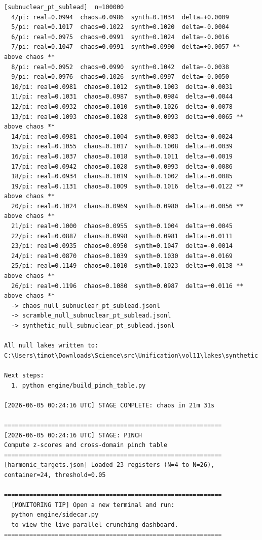 \documentclass[11pt, letterpaper, openany]{book}
\begin{document}
\begin{empiricalbox}
\begin{lstlisting}[style=terminal]
[subnuclear_pt_sublead]  n=100000
  4/pi: real=0.0994  chaos=0.0986  synth=0.1034  delta=+0.0009
  5/pi: real=0.1017  chaos=0.1022  synth=0.1020  delta=-0.0004
  6/pi: real=0.0975  chaos=0.0991  synth=0.1024  delta=-0.0016
  7/pi: real=0.1047  chaos=0.0991  synth=0.0990  delta=+0.0057 ** above chaos **
  8/pi: real=0.0952  chaos=0.0990  synth=0.1042  delta=-0.0038
  9/pi: real=0.0976  chaos=0.1026  synth=0.0997  delta=-0.0050
  10/pi: real=0.0981  chaos=0.1012  synth=0.1003  delta=-0.0031
  11/pi: real=0.1031  chaos=0.0987  synth=0.0984  delta=+0.0044
  12/pi: real=0.0932  chaos=0.1010  synth=0.1026  delta=-0.0078
  13/pi: real=0.1093  chaos=0.1028  synth=0.0993  delta=+0.0065 ** above chaos **
  14/pi: real=0.0981  chaos=0.1004  synth=0.0983  delta=-0.0024
  15/pi: real=0.1055  chaos=0.1017  synth=0.1008  delta=+0.0039
  16/pi: real=0.1037  chaos=0.1018  synth=0.1011  delta=+0.0019
  17/pi: real=0.0942  chaos=0.1028  synth=0.0993  delta=-0.0086
  18/pi: real=0.0934  chaos=0.1019  synth=0.1002  delta=-0.0085
  19/pi: real=0.1131  chaos=0.1009  synth=0.1016  delta=+0.0122 ** above chaos **
  20/pi: real=0.1024  chaos=0.0969  synth=0.0980  delta=+0.0056 ** above chaos **
  21/pi: real=0.1000  chaos=0.0955  synth=0.1004  delta=+0.0045
  22/pi: real=0.0887  chaos=0.0998  synth=0.0981  delta=-0.0111
  23/pi: real=0.0935  chaos=0.0950  synth=0.1047  delta=-0.0014
  24/pi: real=0.0870  chaos=0.1039  synth=0.1030  delta=-0.0169
  25/pi: real=0.1149  chaos=0.1010  synth=0.1023  delta=+0.0138 ** above chaos **
  26/pi: real=0.1196  chaos=0.1080  synth=0.0987  delta=+0.0116 ** above chaos **
  -> chaos_null_subnuclear_pt_sublead.jsonl
  -> scramble_null_subnuclear_pt_sublead.jsonl
  -> synthetic_null_subnuclear_pt_sublead.jsonl

All null lakes written to: C:\Users\timot\Downloads\Science\src\Unification\vol11\lakes\synthetic

Next steps:
  1. python engine/build_pinch_table.py

[2026-06-05 00:24:16 UTC] STAGE COMPLETE: chaos in 21m 31s

============================================================
[2026-06-05 00:24:16 UTC] STAGE: PINCH
Compute z-scores and cross-domain pinch table
============================================================
[harmonic_targets.json] Loaded 23 registers (N=4 to N=26), container=24, threshold=0.05

============================================================
  [MONITORING TIP] Open a new terminal and run:
  python engine/sidecar.py
  to view the live parallel crunching dashboard.
============================================================


\end{lstlisting}
\end{empiricalbox}
\end{document}
